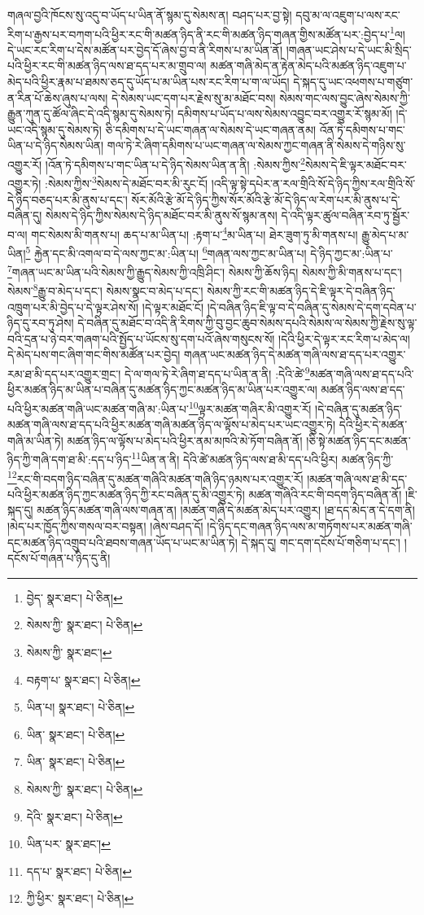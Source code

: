 གཞལ་བྱའི་ཁོངས་སུ་འདུ་བ་ཡོད་པ་ཡིན་ནོ་སྙམ་དུ་སེམས་ན། བཤད་པར་བྱ་སྟེ། དབུ་མ་ལ་འཇུག་པ་ལས་རང་རིག་པ་རྒྱས་པར་བཀག་པའི་ཕྱིར་རང་གི་མཚན་ཉིད་ནི་རང་གི་མཚན་ཉིད་གཞན་གྱིས་མཚོན་པར་:བྱེད་པ་\footnote{བྱེད་  སྣར་ཐང་།  པེ་ཅིན། }ལ། དེ་ཡང་རང་རིག་པ་དེས་མཚོན་པར་བྱེད་དོ་ཞེས་བྱ་བ་ནི་རིགས་པ་མ་ཡིན་ནོ། །གཞན་ཡང་ཤེས་པ་དེ་ཡང་མི་སྲིད་པའི་ཕྱིར་རང་གི་མཚན་ཉིད་ལས་ཐ་དད་པར་མ་གྲུབ་ལ། མཚན་གཞི་མེད་ན་རྟེན་མེད་པའི་མཚན་ཉིད་འཇུག་པ་མེད་པའི་ཕྱིར་རྣམ་པ་ཐམས་ཅད་དུ་ཡོད་པ་མ་ཡིན་པས་རང་རིག་པ་ག་ལ་ཡོད། དེ་སྐད་དུ་ཡང་འཕགས་པ་གཙུག་ན་རིན་པོ་ཆེས་ཞུས་པ་ལས། དེ་སེམས་ཡང་དག་པར་རྗེས་སུ་མ་མཐོང་བས། སེམས་གང་ལས་བྱུང་ཞེས་སེམས་ཀྱི་རྒྱུན་ཀུན་དུ་ཚོལ་ཞིང་དེ་འདི་སྙམ་དུ་སེམས་ཏེ། དམིགས་པ་ཡོད་པ་ལས་སེམས་འབྱུང་བར་འགྱུར་རོ་སྙམ་མོ། །དེ་ཡང་འདི་སྙམ་དུ་སེམས་ཏེ། ཅི་དམིགས་པ་དེ་ཡང་གཞན་ལ་སེམས་དེ་ཡང་གཞན་ནམ། འོན་ཏེ་དམིགས་པ་གང་ཡིན་པ་དེ་ཉིད་སེམས་ཡིན། གལ་ཏེ་རེ་ཞིག་དམིགས་པ་ཡང་གཞན་ལ་སེམས་ཀྱང་གཞན་ནི་སེམས་དེ་གཉིས་སུ་འགྱུར་རོ། །འོན་ཏེ་དམིགས་པ་གང་ཡིན་པ་དེ་ཉིད་སེམས་ཡིན་ན་ནི། :སེམས་ཀྱིས་\footnote{སེམས་ཀྱི་  སྣར་ཐང་།  པེ་ཅིན། }སེམས་དེ་ཇི་ལྟར་མཐོང་བར་འགྱུར་ཏེ། :སེམས་ཀྱིས་\footnote{སེམས་ཀྱི་  སྣར་ཐང་། }སེམས་དེ་མཐོང་བར་མི་རུང་ངོ། །འདི་ལྟ་སྟེ་དཔེར་ན་རལ་གྲིའི་སོ་དེ་ཉིད་ཀྱིས་རལ་གྲིའི་སོ་དེ་ཉིད་བཅད་པར་མི་ནུས་པ་དང་། སོར་མོའི་རྩེ་མོ་དེ་ཉིད་ཀྱིས་སོར་མོའི་རྩེ་མོ་དེ་ཉིད་ལ་རེག་པར་མི་ནུས་པ་དེ་བཞིན་དུ། སེམས་དེ་ཉིད་ཀྱིས་སེམས་དེ་ཉིད་མཐོང་བར་མི་ནུས་སོ་སྙམ་ནས། དེ་འདི་ལྟར་ཚུལ་བཞིན་རབ་ཏུ་སྦྱོར་བ་ལ། གང་སེམས་མི་གནས་པ། ཆད་པ་མ་ཡིན་པ། :རྟག་པ་\footnote{བརྟག་པ་  སྣར་ཐང་།  པེ་ཅིན། }མ་ཡིན་པ། ཐེར་ཟུག་ཏུ་མི་གནས་པ། རྒྱུ་མེད་པ་མ་ཡིན།\footnote{ཡིན་པ།  སྣར་ཐང་།  པེ་ཅིན། } རྐྱེན་དང་མི་འགལ་བ་དེ་ལས་ཀྱང་མ་:ཡིན་པ། \footnote{ཡིན་  སྣར་ཐང་།  པེ་ཅིན། }གཞན་ལས་ཀྱང་མ་ཡིན་པ། དེ་ཉིད་ཀྱང་མ་:ཡིན་པ་\footnote{ཡིན་  སྣར་ཐང་།  པེ་ཅིན། }གཞན་ཡང་མ་ཡིན་པའི་སེམས་ཀྱི་རྒྱུད་སེམས་ཀྱི་འཁྲི་ཤིང་། སེམས་ཀྱི་ཆོས་ཉིད། སེམས་ཀྱི་མི་གནས་པ་དང་། སེམས་\footnote{སེམས་ཀྱི་  སྣར་ཐང་།  པེ་ཅིན། }རྒྱུ་བ་མེད་པ་དང་། སེམས་སྣང་བ་མེད་པ་དང་། སེམས་ཀྱི་རང་གི་མཚན་ཉིད་དེ་ཇི་ལྟར་དེ་བཞིན་ཉིད་འཁྲུག་པར་མི་བྱེད་པ་དེ་ལྟར་ཤེས་སོ། །དེ་ལྟར་མཐོང་ངོ། །དེ་བཞིན་ཉིད་ཇི་ལྟ་བ་དེ་བཞིན་དུ་སེམས་དེ་དག་དབེན་པ་ཉིད་དུ་རབ་ཏུ་ཤེས། དེ་བཞིན་དུ་མཐོང་བ་འདི་ནི་རིགས་ཀྱི་བུ་བྱང་ཆུབ་སེམས་དཔའི་སེམས་ལ་སེམས་ཀྱི་རྗེས་སུ་ལྟ་བའི་དྲན་པ་ཉེ་བར་གཞག་པའི་སྤྱོད་པ་ཡོངས་སུ་དག་པའོ་ཞེས་གསུངས་སོ། །དེའི་ཕྱིར་དེ་ལྟར་རང་རིག་པ་མེད་ལ། དེ་མེད་པས་གང་ཞིག་གང་གིས་མཚོན་པར་བྱེད། གཞན་ཡང་མཚན་ཉིད་དེ་མཚན་གཞི་ལས་ཐ་དད་པར་འགྱུར་རམ་ཐ་མི་དད་པར་འགྱུར་གྲང་། དེ་ལ་གལ་ཏེ་རེ་ཞིག་ཐ་དད་པ་ཡིན་ན་ནི། :དེའི་ཚེ་\footnote{དེའི་  སྣར་ཐང་།  པེ་ཅིན། }མཚན་གཞི་ལས་ཐ་དད་པའི་ཕྱིར་མཚན་ཉིད་མ་ཡིན་པ་བཞིན་དུ་མཚན་ཉིད་ཀྱང་མཚན་ཉིད་མ་ཡིན་པར་འགྱུར་ལ། མཚན་ཉིད་ལས་ཐ་དད་པའི་ཕྱིར་མཚན་གཞི་ཡང་མཚན་གཞི་མ་:ཡིན་པ་\footnote{ཡིན་པར་  སྣར་ཐང་། }ལྟར་མཚན་གཞིར་མི་འགྱུར་རོ། །དེ་བཞིན་དུ་མཚན་ཉིད་མཚན་གཞི་ལས་ཐ་དད་པའི་ཕྱིར་མཚན་གཞི་མཚན་ཉིད་ལ་ལྟོས་པ་མེད་པར་ཡང་འགྱུར་ཏེ། དེའི་ཕྱིར་དེ་མཚན་གཞི་མ་ཡིན་ཏེ། མཚན་ཉིད་ལ་ལྟོས་པ་མེད་པའི་ཕྱིར་ནམ་མཁའི་མེ་ཏོག་བཞིན་ནོ། །ཅི་སྟེ་མཚན་ཉིད་དང་མཚན་ཉིད་ཀྱི་གཞི་དག་ཐ་མི་:དད་པ་ཉིད་\footnote{དད་པ་  སྣར་ཐང་།  པེ་ཅིན། }ཡིན་ན་ནི། དེའི་ཚེ་མཚན་ཉིད་ལས་ཐ་མི་དད་པའི་ཕྱིར། མཚན་ཉིད་ཀྱི་\footnote{ཀྱི་ཕྱིར་  སྣར་ཐང་།  པེ་ཅིན། }རང་གི་བདག་ཉིད་བཞིན་དུ་མཚན་གཞིའི་མཚན་གཞི་ཉིད་ཉམས་པར་འགྱུར་རོ། །མཚན་གཞི་ལས་ཐ་མི་དད་པའི་ཕྱིར་མཚན་ཉིད་ཀྱང་མཚན་ཉིད་ཀྱི་རང་བཞིན་དུ་མི་འགྱུར་ཏེ། མཚན་གཞིའི་རང་གི་བདག་ཉིད་བཞིན་ནོ། །ཇི་སྐད་དུ། མཚན་ཉིད་མཚན་གཞི་ལས་གཞན་ན། །མཚན་གཞི་དེ་མཚན་མེད་པར་འགྱུར། །ཐ་དད་མེད་ན་དེ་དག་ནི། །མེད་པར་ཁྱོད་ཀྱིས་གསལ་བར་བསྟན། །ཞེས་བཤད་དོ། །དེ་ཉིད་དང་གཞན་ཉིད་ལས་མ་གཏོགས་པར་མཚན་གཞི་དང་མཚན་ཉིད་འགྲུབ་པའི་ཐབས་གཞན་ཡོད་པ་ཡང་མ་ཡིན་ཏེ། དེ་སྐད་དུ། གང་དག་དངོས་པོ་གཅིག་པ་དང་། །དངོས་པོ་གཞན་པ་ཉིད་དུ་ནི། 
